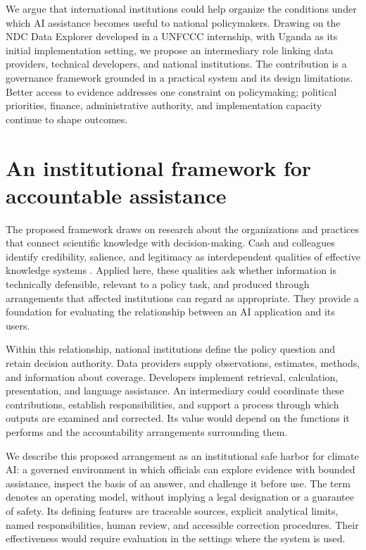 \documentclass[11pt]{article}
\begin{document}
We argue that international institutions could help organize the conditions under which AI assistance becomes useful to national policymakers. Drawing on the NDC Data Explorer developed in a UNFCCC internship, with Uganda as its initial implementation setting, we propose an intermediary role linking data providers, technical developers, and national institutions. The contribution is a governance framework grounded in a practical system and its design limitations. Better access to evidence addresses one constraint on policymaking; political priorities, finance, administrative authority, and implementation capacity continue to shape outcomes.

\section*{An institutional framework for accountable assistance}

The proposed framework draws on research about the organizations and practices that connect scientific knowledge with decision-making. Cash and colleagues identify credibility, salience, and legitimacy as interdependent qualities of effective knowledge systems \cite{cash2003}. Applied here, these qualities ask whether information is technically defensible, relevant to a policy task, and produced through arrangements that affected institutions can regard as appropriate. They provide a foundation for evaluating the relationship between an AI application and its users.

Within this relationship, national institutions define the policy question and retain decision authority. Data providers supply observations, estimates, methods, and information about coverage. Developers implement retrieval, calculation, presentation, and language assistance. An intermediary could coordinate these contributions, establish responsibilities, and support a process through which outputs are examined and corrected. Its value would depend on the functions it performs and the accountability arrangements surrounding them.

We describe this proposed arrangement as an institutional safe harbor for climate AI: a governed environment in which officials can explore evidence with bounded assistance, inspect the basis of an answer, and challenge it before use. The term denotes an operating model, without implying a legal designation or a guarantee of safety. Its defining features are traceable sources, explicit analytical limits, named responsibilities, human review, and accessible correction procedures. Their effectiveness would require evaluation in the settings where the system is used.
\end{document}
